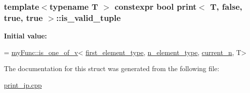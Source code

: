 \subsubsection[{\texorpdfstring{is\+\_\+valid\+\_\+tuple}{is_valid_tuple}}]{\setlength{\rightskip}{0pt plus 5cm}template$<$typename T $>$ constexpr bool {\bf print}$<$ T, false, true, true $>$\+::is\+\_\+valid\+\_\+tuple\hspace{0.3cm}{\ttfamily [static]}}\hypertarget{structprint_3_01T_00_01false_00_01true_00_01true_01_4_ac26cb1e1f2d4e622fc9bd7ba97555dc4}{}\label{structprint_3_01T_00_01false_00_01true_00_01true_01_4_ac26cb1e1f2d4e622fc9bd7ba97555dc4}
{\bfseries Initial value\+:}
\begin{DoxyCode}
= \hyperlink{namespacemyFunc_aa757a804546f113b7cadf75b0a1ec7e1}{myFunc::is\_one\_of\_v}<
            \hyperlink{structprint_3_01T_00_01false_00_01true_00_01true_01_4_a2dae0d9d3db0a28ae73051bef2394aaa}{first\_element\_type},
            \hyperlink{structprint_3_01T_00_01false_00_01true_00_01true_01_4_a6b6bfb81869a40026880ebd0d82cd25a}{n\_element\_type},
            \hyperlink{structprint_3_01T_00_01false_00_01true_00_01true_01_4_a1b88695798454d00772ed00dde4f10b8}{current\_n},
            T>
\end{DoxyCode}


The documentation for this struct was generated from the following file\+:\begin{DoxyCompactItemize}
\item 
\hyperlink{print__ip_8cpp}{print\+\_\+ip.\+cpp}\end{DoxyCompactItemize}
